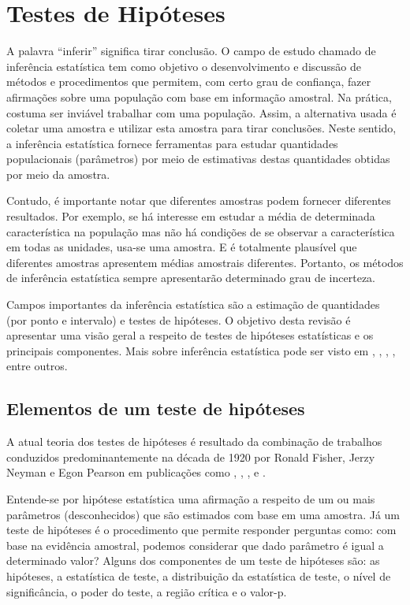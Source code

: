 
\section{Testes de Hipóteses}

A palavra ``inferir'' significa tirar conclusão. O campo de estudo chamado de inferência estatística tem como objetivo o desenvolvimento e discussão de métodos e procedimentos que permitem, com certo grau de confiança, fazer afirmações sobre uma população com base em informação amostral. Na prática, costuma ser inviável trabalhar com uma população. Assim, a alternativa usada é coletar uma amostra e utilizar esta amostra para tirar conclusões. Neste sentido, a inferência estatística fornece ferramentas para estudar quantidades populacionais (parâmetros) por meio de estimativas destas quantidades obtidas por meio da amostra.

Contudo, é importante notar que diferentes amostras podem fornecer diferentes resultados. Por exemplo, se há interesse em estudar a média de determinada característica na população mas não há condições de se observar a característica em todas as unidades, usa-se uma amostra. E é totalmente plausível que diferentes amostras apresentem médias amostrais diferentes. Portanto, os métodos de inferência estatística sempre apresentarão determinado grau de incerteza. 

Campos importantes da inferência estatística são a estimação de quantidades (por ponto e intervalo) e testes de hipóteses. O objetivo desta revisão é apresentar uma visão geral a respeito de testes de hipóteses estatísticas e os principais componentes. Mais sobre inferência estatística pode ser visto em \citet{barndorff2017}, \citet{silvey2017}, \citet{azzalini2017}, \citet{wasserman2013all}, entre outros.

\subsection{Elementos de um teste de hipóteses}

A atual teoria dos testes de hipóteses é resultado da combinação de  trabalhos conduzidos predominantemente na década de 1920 por Ronald Fisher, Jerzy Neyman e Egon Pearson em publicações como \citet{fisherarrangement}, \citet{fisher1929}, \citet{neyman2020use1}, \citet{neyman2020use2} e \citet{neyman1933ix}. 

Entende-se por hipótese estatística uma afirmação a respeito de um ou 
mais parâmetros (desconhecidos) que são estimados com base em uma amostra. Já um teste de hipóteses é o procedimento que permite responder perguntas como: com base na evidência amostral, podemos considerar que dado parâmetro é igual a determinado valor? Alguns dos componentes de um teste de hipóteses são: as hipóteses, a estatística de teste, a distribuição da estatística de teste, o nível de significância, o poder do teste, a região crítica e o valor-p.

